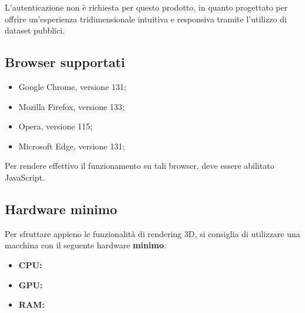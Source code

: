 L'autenticazione non è richiesta per questo prodotto, in quanto progettato per offrire un'esperienza tridimensionale
intuitiva e responsiva tramite l'utilizzo di dataset pubblici.

\subsection{Browser supportati}
\begin{itemize}
    \item Google Chrome, versione 131;
    \item Mozilla Firefox, versione 133;
    \item Opera, versione 115;
    \item Microsoft Edge, versione 131;
\end{itemize}

Per rendere effettivo il funzionamento su tali browser, deve essere abilitato JavaScript.

\subsection{Hardware minimo}
Per sfruttare appieno le funzionalità di rendering 3D, si consiglia di utilizzare una macchina con il seguente hardware \textbf{minimo}:
\begin{itemize}
    \item \textbf{CPU:}
    \item \textbf{GPU:}
    \item \textbf{RAM:}
\end{itemize}
